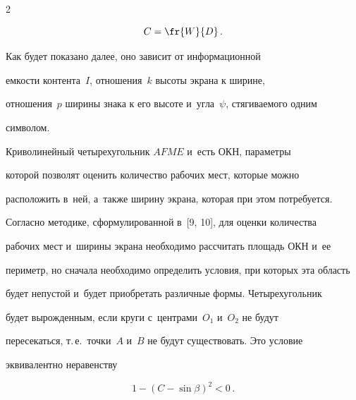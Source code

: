 \begin{multicols}{2}
\begin{description}
\vspace*{-2pt}



\noindent

\begin{equation}

C=\fr{W}{D}\,.

\label{e1-zat}

\end{equation}



\vspace*{-2pt}



\noindent

Как будет показано далее, оно зависит от информационной

емкости контента~$I$, отношения~$k$ высоты экрана к ширине,

отношения~$p$ ширины знака к его высоте и~угла~$\psi$, стя\-ги\-ва\-емо\-го одним

символом.

\end{description}



     Криволинейный четырехугольник $AFME$ и~есть ОКН, параметры

которой позволят оценить количество рабочих мест, которые можно

расположить в~ней, а~так\-же ширину экрана, которая при этом потребуется.

Согласно методике, сформулированной в~[9, 10], для оценки количества

рабочих мест и~ширины экрана необходимо рассчитать площадь ОКН и~ее

периметр, но сначала необходимо определить условия, при которых эта область

будет непустой и~будет приобретать различные формы. Четырехугольник

будет вырожденным, если круги с~центрами~$O_1$ и~$O_2$ не будут

пересекаться, т.\,е.\ точки~$A$ и~$B$ не будут существовать. Это условие

эквивалентно неравенству

     \begin{equation}

     1-\left (C-\sin \beta\right)^2<0\,.

     \label{e2-zat}

     \end{equation}






\end{multicols}
